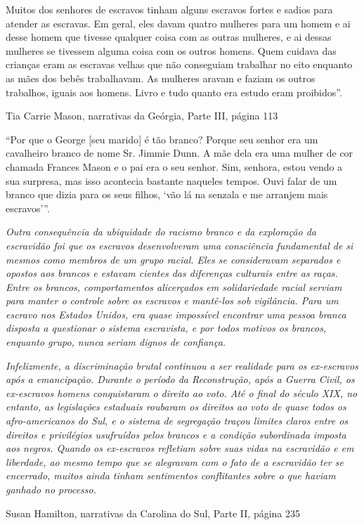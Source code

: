 Muitos dos senhores de escravos tinham alguns escravos fortes e sadios
para atender as escravas. Em geral, eles davam quatro mulheres para um
homem e ai desse homem que tivesse qualquer coisa com as outras
mulheres, e ai dessas mulheres se tivessem alguma coisa com os outros
homens. Quem cuidava das crianças eram as escravas velhas que não
conseguiam trabalhar no eito enquanto as mães dos bebês trabalhavam. As
mulheres aravam e faziam os outros trabalhos, iguais aos homens. Livro e
tudo quanto era estudo eram proibidos''.

Tia Carrie Mason, narrativas da Geórgia, Parte III, página 113

``Por que o George {[}seu marido{]} é tão branco? Porque seu senhor era
um cavalheiro branco de nome Sr. Jimmie Dunn. A mãe dela era uma mulher
de cor chamada Frances Mason e o pai era o seu senhor. Sim, senhora,
estou vendo a sua surpresa, mas isso acontecia bastante naqueles tempos.
Ouvi falar de um branco que dizia para os seus filhos, `vão lá na
senzala e me arranjem mais escravos'''.

\emph{Outra consequência da ubiquidade do racismo branco e da exploração
da escravidão foi que os escravos desenvolveram uma consciência
fundamental de si mesmos como membros de um grupo racial. Eles se
consideravam separados e opostos aos brancos e estavam cientes das
diferenças culturais entre as raças. Entre os brancos, comportamentos
alicerçados em solidariedade racial serviam para manter o controle sobre
os escravos e mantê-los sob vigilância. Para um escravo nos Estados
Unidos, era quase impossível encontrar uma pessoa branca disposta a
questionar o sistema escravista, e por todos motivos os brancos,
enquanto grupo, nunca seriam dignos de confiança.}

\emph{Infelizmente, a discriminação brutal continuou a ser realidade
para os ex-escravos após a emancipação. Durante o período da
Reconstrução, após a Guerra Civil, os ex-escravos homens conquistaram o
direito ao voto. Até o final do século XIX, no entanto, as legislações
estaduais roubaram os direitos ao voto de quase todos os afro-americanos
do Sul, e o sistema de segregação traçou limites claros entre os
direitos e privilégios usufruídos pelos brancos e a condição subordinada
imposta aos negros. Quando os ex-escravos refletiam sobre suas vidas na
escravidão e em liberdade, ao mesmo tempo que se alegravam com o fato de
a escravidão ter se encerrado, muitos ainda tinham sentimentos
conflitantes sobre o que haviam ganhado no processo.}

Susan Hamilton, narrativas da Carolina do Sul, Parte II, página 235

